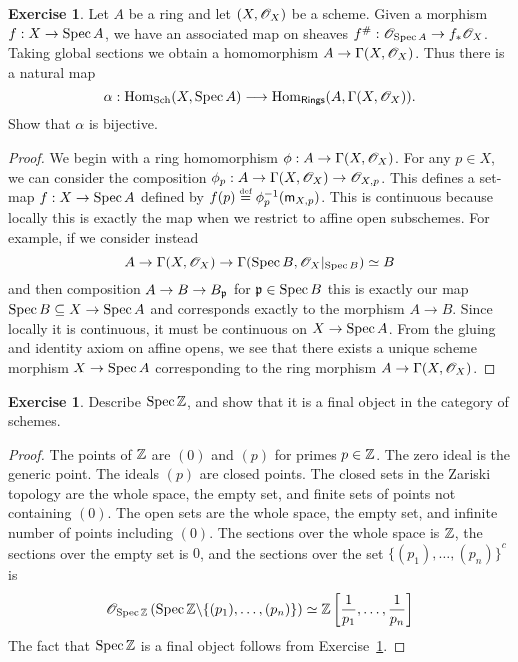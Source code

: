 \documentclass[]{pcmi}
\theoremstyle{plain}
\theoremstyle{definition}
\newtheorem{Exercise}[subsubsection]{Exercise}
\theoremstyle{remark}
\begin{document}
\begin{Exercise}\label{Exercise:2.2.4}
    Let $A$ be a ring and let $(X, \mathscr{O}_X)$ be a scheme. Given a morphism $f : X \to \operatorname{Spec} A$, we have an associated map on sheaves $f^\# : \mathscr{O}_{\operatorname{Spec} A} \to f_* \mathscr{O}_X$. Taking global sections we obtain a homomorphism $A \to \Gamma(X, \mathscr{O}_X)$. Thus there is a natural map 
    \[
        \alpha : \operatorname{Hom}_{\operatorname{Sch}}(X, \operatorname{Spec} A) \longrightarrow \operatorname{Hom}_{\mathsf{Rings}}(A, \Gamma(X, \mathscr{O}_X)).
    \]
    Show that $\alpha$ is bijective. 
\end{Exercise}

\begin{proof}
    We begin with a ring homomorphism $\phi : A \to \Gamma(X, \mathscr{O}_X)$. For any $p \in X$, we can consider the composition $\phi_p : A \to \Gamma(X, \mathscr{O}_X) \to \mathscr{O}_{X, p}$. This defines a set-map $f : X \to \operatorname{Spec} A$ defined by $f(p) \overset{\textup{\tiny def}}= \phi_p^{-1}(\mathsf{m}_{X, p})$. This is continuous because locally this is exactly the map when we restrict to affine open subschemes. For example, if we consider instead 
    \[
        A \to \Gamma(X, \mathscr{O}_X) \to \Gamma(\operatorname{Spec} B, \mathscr{O}_X|_{\operatorname{Spec} B}) \simeq B
    \]
    and then composition $A \to B \to B_{\mathfrak{p}}$ for $\mathfrak{p} \in \operatorname{Spec} B$ this is exactly our map $\operatorname{Spec} B \subseteq X \to \operatorname{Spec} A$ and corresponds exactly to the morphism $A \to B$. Since locally it is continuous, it must be continuous on $X \to \operatorname{Spec} A$. From the gluing and identity axiom on affine opens, we see that there exists a unique scheme morphism $X \to \operatorname{Spec} A$ corresponding to the ring morphism $A \to \Gamma(X, \mathscr{O}_X)$. 
\end{proof}

\begin{Exercise}
    Describe $\operatorname{Spec} \mathbb{Z}$, and show that it is a final object in the category of schemes. 
\end{Exercise}

\begin{proof}
    The points of $\mathbb{Z}$ are $(0)$ and $(p)$ for primes $p \in \mathbb{Z}$. The zero ideal is the generic point. The ideals $(p)$ are closed points. The closed sets in the Zariski topology are the whole space, the empty set, and finite sets of points not containing $(0)$. The open sets are the whole space, the empty set, and infinite number of points including $(0)$. The sections over the whole space is $\mathbb{Z}$, the sections over the empty set is $0$, and the sections over the set ${\{(p_1), \ldots, (p_n)\}}^c$ is 
    \[
        \mathscr{O}_{\operatorname{Spec} \mathbb{Z}} \left( \operatorname{Spec} \mathbb{Z} \backslash \{(p_1), \ldots, (p_n) \} \right) \simeq \mathbb{Z} \left[ \frac{1}{p_1}, \ldots, \frac{1}{p_n} \right]
    \]
    The fact that $\operatorname{Spec} \mathbb{Z}$ is a final object follows from Exercise~\ref{Exercise:2.2.4}. 
\end{proof}
\end{document}

